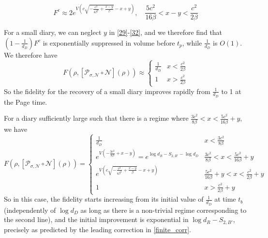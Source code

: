 \documentclass[a4paper,11pt]{article}
\newcommand{\SV}[1]{\textcolor{red}{#1}}
\newcommand{\be}{\begin{equation}}
\newcommand{\ee}{\end{equation}}
\begin{document}
\begin{enumerate}
\begin{appendix}
\begin{enumerate}
\be 
F^c \approx 2 e^{V (c \sqrt{-\frac{c^2}{4\beta^2} + \frac{x-y}{\beta}} -x+y )}, \quad  \frac{5c^2}{16\beta} < x-y < \frac{c^2}{2\beta} \label{32}
\ee
\end{enumerate} 
For a small diary, we can neglect $y$ in \eqref{29}-\eqref{32}, and we therefore find that $(1- \frac{1}{d_D})F^c$ is exponentially suppressed in volume before $t_p$, while $\frac{1}{d_D}$ is $O(1)$. We therefore have 
\be 
F(\rho , [\mathcal{P}_{\sigma,\mathcal{N}}\circ \mathcal{N}](\rho)) \approx \begin{cases} 
 \frac{1}{d_D} & x < \frac{c^2}{2\beta} \\
 1 & x > \frac{c^2}{2\beta}
\end{cases} 
\label{smalldiary_c}
\ee
So the fidelity for the recovery of a small diary improves rapidly from $\frac{1}{d_D}$ to 1 at the Page time. 


For a diary sufficiently large such that 
there is a regime where $\frac{3c^2}{8\beta} < x < \frac{5c^2}{16\beta} +y$, we have 
\be 
F(\rho , [\mathcal{P}_{\sigma,\mathcal{N}}\circ \mathcal{N}](\rho))
= \begin{cases} 
\frac{1}{d_D} & x< \frac{3c^2}{8\beta} \\
 e^{V(-\frac{3c^2}{8\beta} + x-y)} =e^{\log d_R-S_{2, B'}-\log d_D} & \frac{3c^2}{8\beta} < x < \frac{5c^2}{16\beta} +y \\ 
 e^{V (c \sqrt{-\frac{c^2}{4\beta^2} + \frac{x-y}{\beta}} -x+y )} & \frac{5c^2}{16\beta} +y < x < \frac{c^2}{2\beta} +y\\
 1 & x> \frac{c^2}{2\beta} +y
\end{cases} 
\label{large_fid}
\ee
So in this case, the fidelity starts increasing from its initial value of $\frac{1}{d_D}$ at time $t_b$ (independently of $\log d_D$ as long as there is a non-trivial regime corresponding to the second line), and the initial improvement is exponential in $\log d_R- S_{2, B'}$, precisely as predicted by the leading correction in \eqref{finite_corr}. 


\end{appendix}
\end{enumerate}
\end{document}
